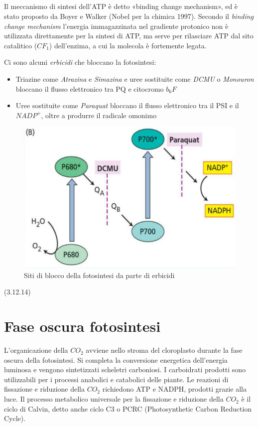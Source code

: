 \documentclass[a4paper,12pt]{book}
\begin{document}
\paragraph{}
Il meccanismo di sintesi dell’ATP è detto «binding change mechanism», ed è stato proposto da Boyer e
Walker (Nobel per la chimica 1997).
Secondo il \emph{binding change mechanism} l’energia immagazzinata nel gradiente protonico non è
utilizzata direttamente per la sintesi di ATP, ma serve per rilasciare ATP dal sito catalitico ($CF_{1}$)
dell’enzima, a cui la molecola è fortemente legata.

Ci sono alcuni \emph{erbicidi} che bloccano la fotosintesi:
\begin{itemize}
\item{Triazine come \emph{Atrazina} e \emph{Simazina} e uree sostituite come \emph{DCMU} o \emph{Monouron} bloccano il flusso elettronico tra PQ e citocromo $b_{6}F$}
\item{Uree sostituite come \emph{Paraquat} bloccano il flusso elettronico tra il PSI e il $NADP^{+}$, oltre a produrre il radicale omonimo}
\end{itemize}
\begin{figure}[H]
\centering
\includegraphics[scale=0.4]{immagini/erbicidi.jpg}
\caption{Siti di blocco della fotosintesi da parte di erbicidi}
\end{figure}

(3.12.14)

\chapter{Fase oscura fotosintesi}
L’organicazione della $CO_{2}$ avviene nello stroma del cloroplasto durante la fase oscura della fotosintesi.
Si completa la conversione energetica dell'energia luminosa e vengono sintetizzati scheletri carboniosi. I
carboidrati prodotti sono utilizzabili per i processi anabolici e catabolici delle piante.
Le reazioni di fissazione e riduzione della $CO_{2}$ richiedono ATP e NADPH, prodotti grazie alla luce.
Il processo metabolico universale per la fissazione e riduzione della $CO_{2}$ è il ciclo di Calvin, detto anche
ciclo C3 o PCRC (Photosynthetic Carbon Reduction Cycle).
\end{document}
